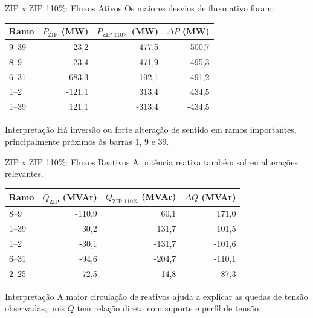\documentclass[aspectratio=169,11pt]{beamer}
\begin{document}
\begin{frame}{ZIP x ZIP 110\%: Fluxos Ativos}
  Os maiores desvios de fluxo ativo foram:

  \begin{table}
    \centering
    \small
    \begin{tabular}{lrrr}
      \toprule
      Ramo & $P_{\text{ZIP}}$ (MW) & $P_{\text{ZIP 110\%}}$ (MW) & $\Delta P$ (MW) \\
      \midrule
      9--39 & 23,2 & -477,5 & -500,7 \\
      8--9 & 23,4 & -471,9 & -495,3 \\
      6--31 & -683,3 & -192,1 & 491,2 \\
      1--2 & -121,1 & 313,4 & 434,5 \\
      1--39 & 121,1 & -313,4 & -434,5 \\
      \bottomrule
    \end{tabular}
  \end{table}

  \begin{block}{Interpretação}
    Há inversão ou forte alteração de sentido em ramos importantes, principalmente próximos às barras 1, 9 e 39.
  \end{block}
\end{frame}

\begin{frame}{ZIP x ZIP 110\%: Fluxos Reativos}
  A potência reativa também sofreu alterações relevantes.

  \begin{table}
    \centering
    \small
    \begin{tabular}{lrrr}
      \toprule
      Ramo & $Q_{\text{ZIP}}$ (MVAr) & $Q_{\text{ZIP 110\%}}$ (MVAr) & $\Delta Q$ (MVAr) \\
      \midrule
      8--9 & -110,9 & 60,1 & 171,0 \\
      1--39 & 30,2 & 131,7 & 101,5 \\
      1--2 & -30,1 & -131,7 & -101,6 \\
      6--31 & -94,6 & -204,7 & -110,1 \\
      2--25 & 72,5 & -14,8 & -87,3 \\
      \bottomrule
    \end{tabular}
  \end{table}

  \begin{block}{Interpretação}
    A maior circulação de reativos ajuda a explicar as quedas de tensão observadas, pois $Q$ tem relação direta com suporte e perfil de tensão.
  \end{block}
\end{frame}
\end{document}
